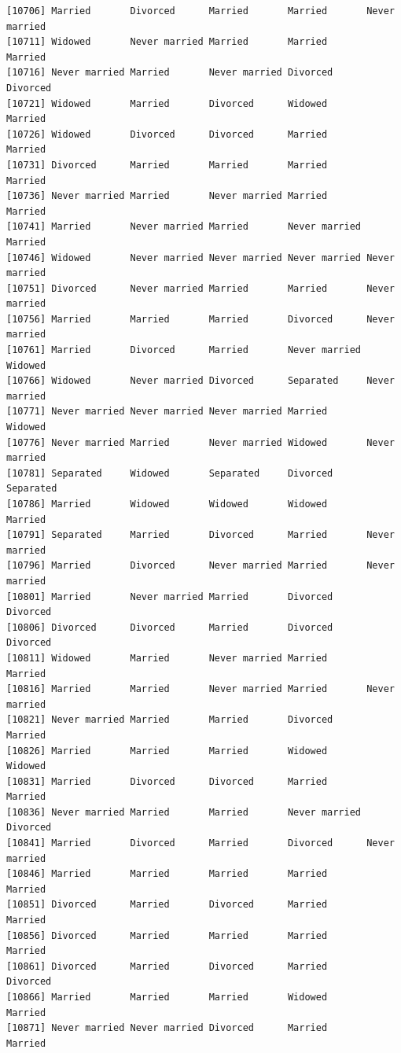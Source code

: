 \documentclass[
  letterpaper,
  DIV=11,
  numbers=noendperiod,
  oneside]{scrartcl}
\begin{document}
\begin{verbatim}
[10706] Married       Divorced      Married       Married       Never married
[10711] Widowed       Never married Married       Married       Married      
[10716] Never married Married       Never married Divorced      Divorced     
[10721] Widowed       Married       Divorced      Widowed       Married      
[10726] Widowed       Divorced      Divorced      Married       Married      
[10731] Divorced      Married       Married       Married       Married      
[10736] Never married Married       Never married Married       Married      
[10741] Married       Never married Married       Never married Married      
[10746] Widowed       Never married Never married Never married Never married
[10751] Divorced      Never married Married       Married       Never married
[10756] Married       Married       Married       Divorced      Never married
[10761] Married       Divorced      Married       Never married Widowed      
[10766] Widowed       Never married Divorced      Separated     Never married
[10771] Never married Never married Never married Married       Widowed      
[10776] Never married Married       Never married Widowed       Never married
[10781] Separated     Widowed       Separated     Divorced      Separated    
[10786] Married       Widowed       Widowed       Widowed       Married      
[10791] Separated     Married       Divorced      Married       Never married
[10796] Married       Divorced      Never married Married       Never married
[10801] Married       Never married Married       Divorced      Divorced     
[10806] Divorced      Divorced      Married       Divorced      Divorced     
[10811] Widowed       Married       Never married Married       Married      
[10816] Married       Married       Never married Married       Never married
[10821] Never married Married       Married       Divorced      Married      
[10826] Married       Married       Married       Widowed       Widowed      
[10831] Married       Divorced      Divorced      Married       Married      
[10836] Never married Married       Married       Never married Divorced     
[10841] Married       Divorced      Married       Divorced      Never married
[10846] Married       Married       Married       Married       Married      
[10851] Divorced      Married       Divorced      Married       Married      
[10856] Divorced      Married       Married       Married       Married      
[10861] Divorced      Married       Divorced      Married       Divorced     
[10866] Married       Married       Married       Widowed       Married      
[10871] Never married Never married Divorced      Married       Married      

\end{verbatim}
\end{document}
